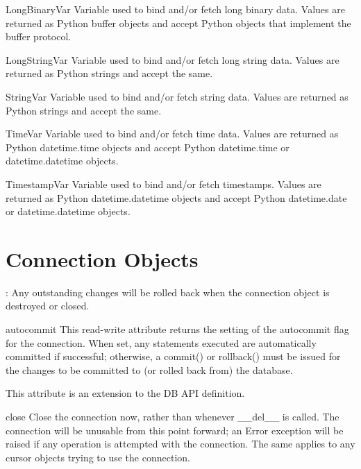 \documentclass{manual}
\begin{document}
\begin{datadesc}{LongBinaryVar}
  Variable used to bind and/or fetch long binary data. Values are returned as
  Python buffer objects and accept Python objects that implement the buffer
  protocol.
\end{datadesc}

\begin{datadesc}{LongStringVar}
  Variable used to bind and/or fetch long string data. Values are returned as
  Python strings and accept the same.
\end{datadesc}

\begin{datadesc}{StringVar}
  Variable used to bind and/or fetch string data. Values are returned as Python
  strings and accept the same.
\end{datadesc}

\begin{datadesc}{TimeVar}
  Variable used to bind and/or fetch time data. Values are returned as Python
  datetime.time objects and accept Python datetime.time or datetime.datetime
  objects.
\end{datadesc}

\begin{datadesc}{TimestampVar}
  Variable used to bind and/or fetch timestamps. Values are returned as Python
  datetime.datetime objects and accept Python datetime.date or
  datetime.datetime objects.
\end{datadesc}

\chapter{Connection Objects\label{connobj}}

: Any outstanding changes will be rolled back when the connection
object is destroyed or closed.

\begin{datadesc}{autocommit}
  This read-write attribute returns the setting of the autocommit flag for the
  connection. When set, any statements executed are automatically committed
  if successful; otherwise, a commit() or rollback() must be issued for the
  changes to be committed to (or rolled back from) the database.

   This attribute is an extension to the DB API definition.
\end{datadesc}

\begin{funcdesc}{close}{}
  Close the connection now, rather than whenever __del__ is called. The
  connection will be unusable from this point forward; an Error exception will
  be raised if any operation is attempted with the connection. The same applies
  to any cursor objects trying to use the connection.
\end{funcdesc}
\end{document}
